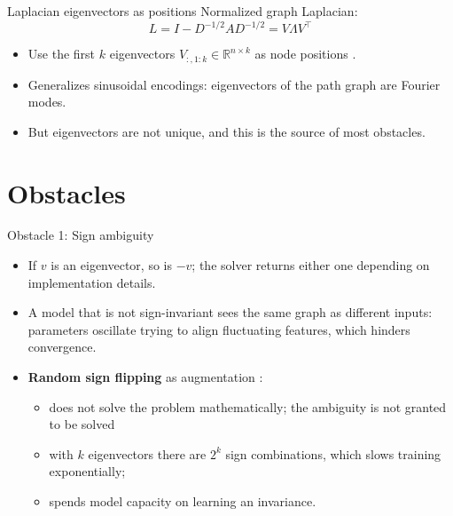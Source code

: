 \documentclass[aspectratio=169,11pt]{beamer}
\newcommand{\R}{\mathbb{R}}
\begin{document}
\begin{frame}{Laplacian eigenvectors as positions}
  Normalized graph Laplacian:
  \begin{equation*}
    L = I - D^{-1/2} A D^{-1/2} = V \Lambda V^\top
  \end{equation*}
  \begin{itemize}
    \item Use the first $k$ eigenvectors $V_{:,1:k} \in \R^{n \times k}$ as node
          positions \citep{dwivedi2020generalization}.
    \item Generalizes sinusoidal encodings: eigenvectors of the path graph
          are Fourier modes.
    \item But eigenvectors are \alert{not unique}, and this is the source of
          most obstacles.
  \end{itemize}
\end{frame}

\section{Obstacles}

\begin{frame}{Obstacle 1: Sign ambiguity}
  \begin{itemize}
    \item If $v$ is an eigenvector, so is $-v$; the solver returns either one
          depending on implementation details.
    \item A model that is not sign-invariant sees the \alert{same graph as
          different inputs}: parameters oscillate trying to align fluctuating
          features, which hinders convergence.
    \item \textbf{Random sign flipping} as augmentation
          \citep{dwivedi2020generalization,kreuzer2021rethinking}:
          \begin{itemize}
            \item does not solve the problem mathematically; the ambiguity is not granted to be solved
            \item with $k$ eigenvectors there are $2^k$ sign combinations,
                  which slows training exponentially;
            \item spends model capacity on learning an invariance.
          \end{itemize}
  \end{itemize}
\end{frame}
\end{document}
